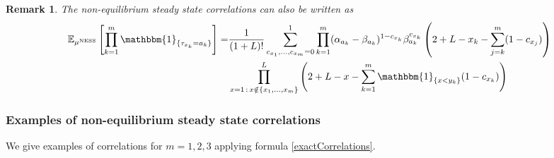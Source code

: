 \documentclass[10pt]{article}
\numberwithin{equation}{section}
\numberwithin{equation}{subsection}
\newtheorem{remark}{Remark}
\begin{document}
\begin{comment}
where 
\begin{equation}\label{powerCoeffSpecies}
	g_{k}(L,x_{k},c_{k},\ldots,c_{m})=\left(L+2-x_{k}-\sum_{j=k}^{m}c_{j}\right)^{c_{k}}
\end{equation}
and 
\begin{equation}\label{powerCoeffNOspec}
	f(L,c_{1},\ldots,c_{m})=\frac{\Gamma(2+L-\sum_{a=1}^{m}c_{a})}{\Gamma(2+L)}
\end{equation}
\end{comment}
{\color{blue}
	\begin{remark}
		The non-equilibrium steady state correlations can also be written as 
			\begin{equation}\label{exactCorrelation_1}
			\begin{split}
				\mathbb{E}_{\mu^{\text{NESS}}}\left[\prod_{k=1}^{m}\mathbbm{1}_{\{\tau_{x_{k}}=a_{k}\}}\right]=&\frac{1}{(1+L)!}\sum_{c_{x_{1}},\ldots,c_{x_{m}}=0}^{1}\prod_{k=1}^{m}(\alpha_{a_{k}}-\beta_{a_{k}})^{1-c_{x_{k}}}\beta_{a_{k}}^{c_{x_{k}}}\left(2+L-x_{k}-\sum_{j=k}^{m}(1-c_{x_{j}})\right)\\&\prod_{x=1\,:\,x\notin \{x_{1},\ldots,x_{m}\}}^{L}\left(2+L-x-\sum_{k=1}^{m}\mathbbm{1}_{\{x<y_{k}\}}(1-c_{x_{k}})\right)
			\end{split}
		\end{equation}
\end{remark}
}
\begin{comment}
\paragraph{Absorption probabilities}
Knowing the non-equilibrium steady state correlations, we can read-off the absorption probabilities defined in \eqref{absProbabilitiesIntegrable}. They are given by
\begin{equation}\label{abs-probabilities}
	\mathcal{P}(t_{1},\ldots,t_{m},\bm{\xi})=\sum_{c_{1}=t_{1}}^{1}\ldots\sum_{c_{m}=t_{m}}^{1}f(L,c_{1},\ldots,c_{m})\prod_{j=1}^{m}(-1)^{c_{j}-t_{j}}g_{j}(L,x_{j},c_{j},\ldots,c_{m})
\end{equation}
. \\ \\
\textbf{Proof of \eqref{abs-probabilities}}: 
From \eqref{exactCorrelations} we have 
 
\begin{flushright}
	$\square$
\end{flushright}
\end{comment}
\subsubsection{Examples of non-equilibrium steady state correlations}
We give examples  of correlations for $m=1,2,3$ applying formula \eqref{exactCorrelations}.
\end{document}
